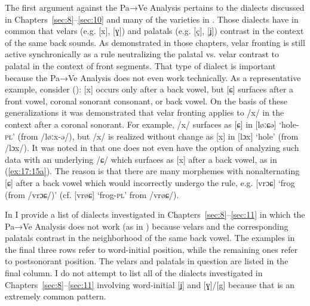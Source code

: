 The first argument against the Pa→Ve Analysis pertains to the dialects discussed in Chapters~\ref{sec:8}--\ref{sec:10} and many of the varieties in . Those dialects have in common that velars (e.g. [x], [ɣ]) and palatals (e.g. [ç], [ʝ]) contrast in the context of the same back sounds. As demonstrated in those chapters, velar fronting is still active synchronically as a rule neutralizing the palatal vs. velar contrast to palatal in the context of front segments. That type of dialect is important because the Pa→Ve Analysis does not even work technically. As a representative example, consider  (): [x] occurs only after a back vowel, but [ɕ] surfaces after a front vowel, coronal sonorant consonant, or back vowel. On the basis of these generalizations it was demonstrated that velar fronting applies to /x/ in the context after a coronal sonorant. For example, /x/ surfaces as [ɕ] in [løːɕǝ] ‘hole-\textsc{pl}’ (from /løːx-ǝ/), but /x/ is realized without change as [x] in [lɔx] ‘hole’ (from /lɔx/). It was noted in  that one does not even have the option of analyzing such data with an underlying /ɕ/ which surfaces as [x] after a back vowel, as in (\ref{ex:17:15a}). The reason is that there are many morphemes with nonalternating [ɕ] after a back vowel which would incorrectly undergo the rule, e.g. [vrɔɕ] ‘frog (from /vrɔɕ/)’ (cf. [vrøɕ] ‘frog-\textsc{pl}’ from /vrøɕ/).

In  I provide a list of dialects investigated in Chapters~\ref{sec:8}--\ref{sec:11} in which the Pa→Ve Analysis does not work (as in ) because velars and the corresponding palatals contrast in the neighborhood of the same back vowel. The examples in the final three rows refer to word-initial position, while the remaining ones refer to postsonorant position. The velars and palatals in question are listed in the final column. I do not attempt to list all of the dialects investigated in Chapters~\ref{sec:8}--\ref{sec:11} involving word-initial [ʝ] and [ɣ]/[g] because that is an extremely common pattern.\largerpage

